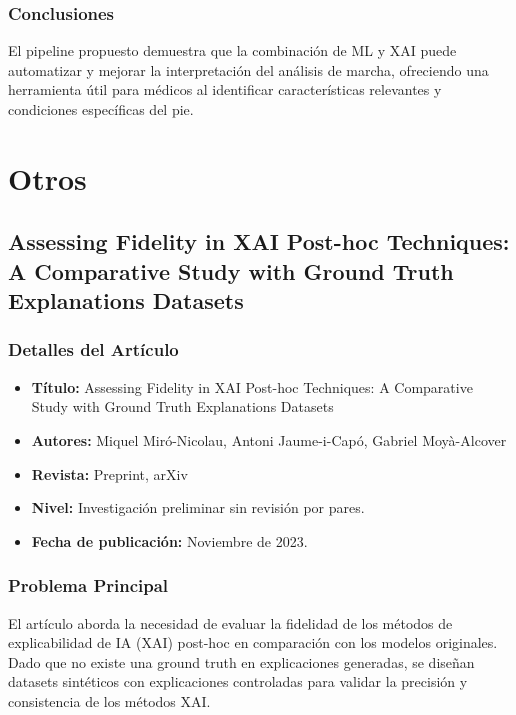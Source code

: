 \documentclass{report}
\begin{document}
\subsection{Conclusiones}
El pipeline propuesto demuestra que la combinación de ML y XAI puede automatizar y mejorar la interpretación del análisis de marcha, ofreciendo una herramienta útil para médicos al identificar características relevantes y condiciones específicas del pie.



\chapter{Otros}

\section{Assessing Fidelity in XAI Post-hoc Techniques: A Comparative Study with Ground Truth Explanations Datasets}

\subsection{Detalles del Artículo}
\begin{itemize}
    \item \textbf{Título:} Assessing Fidelity in XAI Post-hoc Techniques: A Comparative Study with Ground Truth Explanations Datasets
    \item \textbf{Autores:} Miquel Miró-Nicolau, Antoni Jaume-i-Capó, Gabriel Moyà-Alcover
    \item \textbf{Revista:} Preprint, arXiv
    \item \textbf{Nivel:} Investigación preliminar sin revisión por pares.
    \item \textbf{Fecha de publicación:} Noviembre de 2023.
\end{itemize}

\subsection{Problema Principal}
El artículo aborda la necesidad de evaluar la fidelidad de los métodos de explicabilidad de IA (XAI) post-hoc en comparación con los modelos originales. Dado que no existe una ground truth en explicaciones generadas, se diseñan datasets sintéticos con explicaciones controladas para validar la precisión y consistencia de los métodos XAI.
\end{document}
